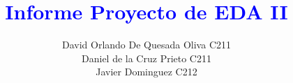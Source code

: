 \documentclass{article}
\begin{document}
    \title{\textcolor{blue}{\textbf{Informe Proyecto de EDA II }}\\}
    \author{David Orlando De Quesada Oliva C211\\Daniel de la Cruz Prieto C211\\ Javier Dominguez C212} 
    \date{}
    \maketitle  
\end{document}
